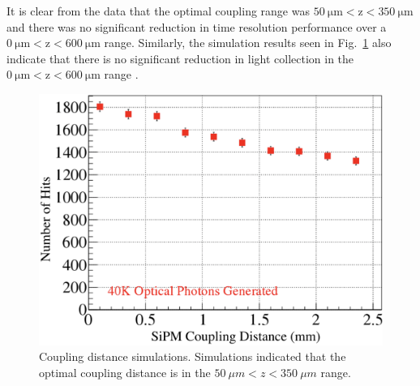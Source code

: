 It is clear from the data that the optimal coupling range was $\mathrm{50\ \mu m < z < 350\ \mu m}$ and there was no significant reduction in time resolution performance over a $\mathrm{0\ \mu m < z < 600\ \mu m}$ range.  Similarly, the simulation results seen in Fig.~\ref{fig:spacing_sim} also indicate that there is no significant reduction in light collection in the $\mathrm{0\ \mu m < z < 600\ \mu m}$ range \cite{puneet_sim_talk}.
	\begin{figure}[!htb]
		\centering
		\includegraphics[width=1.0\columnwidth]{misalignment/figs/spacing_sim}
		\caption{Coupling distance simulations. Simulations indicated that the optimal coupling distance is in the $50\ \mu m < z < 350\ \mu m$ range.}
		\label{fig:spacing_sim}
	\end{figure}